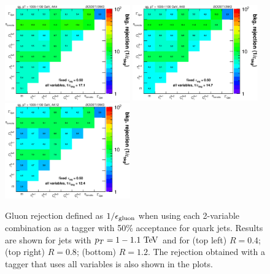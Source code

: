 
%
\begin{figure}
\centering
\includegraphics[width=0.48\textwidth]{./Figures/QGTagging/pT1000/AKtR04/effBkg2D.eps}
\includegraphics[width=0.48\textwidth]{./Figures/QGTagging/pT1000/AKtR08/effBkg2D.eps}
\includegraphics[width=0.48\textwidth]{./Figures/QGTagging/pT1000/AKtR12/effBkg2D.eps}
\caption{Gluon rejection defined as $1/\epsilon_{\rm gluon}$ when using each 2-variable combination 
as a tagger with 50\% acceptance for quark jets. Results are shown for
jets with $\pt=1-1.1 \TeV$ and
for (top left) $R=0.4$; (top right) $R=0.8$; (bottom) $R=1.2$. The rejection obtained with a tagger that uses all variables is also shown
in the plots. }
\label{fig:qg_pt1000_comb}
\end{figure}
%

